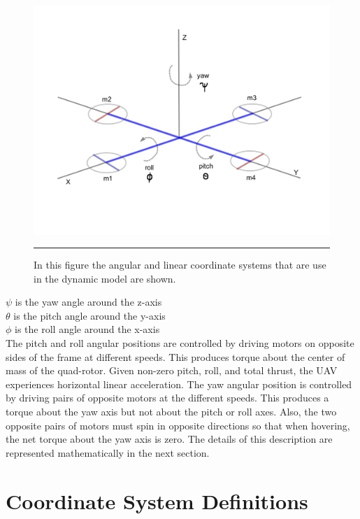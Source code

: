 \begin{figure}[htbp]
  \centering
    \includegraphics[scale = 0.5]{Figures/coords.png}
    \rule{35em}{0.5pt}
  \caption[Quad-Rotor Coordinate System]{In this figure the angular and linear coordinate systems that are use in the dynamic model are shown.}
  \label{fig:Quad-Rotor Coordinate System}
\end{figure}


\indent $ \psi $ is the yaw angle around the z-axis\\
\indent $ \theta $ is the pitch angle around the y-axis\\
\indent $ \phi $ is the roll angle around the x-axis\\



 The pitch and roll angular positions are controlled by driving motors on opposite sides of the frame at different speeds. This produces torque about the center of mass of the quad-rotor. Given non-zero pitch, roll, and total thrust, the UAV experiences horizontal linear acceleration. The yaw angular position is controlled by driving pairs of opposite motors at the different speeds. This produces a torque about the yaw axis but not about the pitch or roll axes. Also, the two opposite pairs of motors must spin in opposite directions so that when hovering, the net torque about the yaw axis is zero. The details of this description are represented mathematically in the next section.



\section{Coordinate System Definitions}

